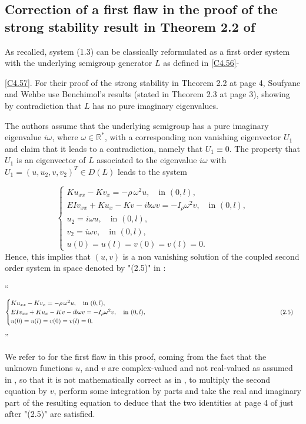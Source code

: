 \documentclass[10pt, english]{article}
\begin{document}
\subsection{Correction of a first flaw in the proof of the strong stability result in Theorem 2.2  of \cite{SW2003}}
As recalled, system (1.3) can be classically reformulated as a first order system with the underlying semigroup generator $L$ as defined in \eqref{C4.56}-{\eqref{C4.57}. For their proof of the strong stability in Theorem 2.2 at page 4, Soufyane and Wehbe \cite{SW2003} use Benchimol's results (stated in Theorem 2.3 at page 3), showing by contradiction that $L$ has no pure imaginary eigenvalues.

The authors assume that the underlying semigroup has a pure imaginary eigenvalue $i\omega$, where $\omega \in \mathbb{R}^{\ast}$, with a corresponding non vanishing eigenvector $U_1$ and claim that it leads to a contradiction, namely that $U_1 \equiv 0$. The property that $U_1$ is an eigenvector of $L$ associated to the eigenvalue $i\omega$ with $U_1=(u, u_2,v,v_2)^T \in D(L)$ leads to the system

\begin{equation}\label{R16}%
\begin{cases}
Ku_{xx} -Kv_x=-\rho\, \omega^2 u, \quad \mbox{in } (0,l),\\
EIv_{xx} +Ku_x -Kv-ib\omega v=-I_{\rho} \omega^2 v, \quad \mbox{in } (0,l),\\
u_2=i\omega u, \quad \mbox{in } (0,l),\\
v_2=i \omega v , \quad \mbox{in } (0,l),\\
u(0)=u(l)=v(0)=v(l)=0.
\end{cases}
\end{equation}
Hence, this implies that $(u,v)$ is a non vanishing solution of the coupled second order system in space denoted by "(2.5)" in \cite{SW2003}:

\enquote{
\begin{equation*}\label{R16b}%
\begin{cases}
Ku_{xx} -Kv_x=-\rho\, \omega^2 u, \quad \mbox{in } (0,l),\\
EIv_{xx} +Ku_x -Kv-ib\omega v=-I_{\rho} \omega^2 v, \quad \mbox{in } (0,l), \hspace{7.5cm}   (2.5)\\
u(0)=u(l)=v(0)=v(l)=0.
\end{cases}
\end{equation*}
}

We refer to \cite{AB2023I} for the first flaw in this proof, coming from the fact that the unknown functions $u$, and $v$ are complex-valued and not real-valued as assumed in \cite{SW2003}, so that it is not mathematically correct as in \cite{SW2003}, to multiply the second equation by $v$, perform some integration by parts and take the real and imaginary part of the resulting equation to deduce that the two identities at page 4 of \cite{SW2003} just after "(2.5)" are satisfied.

}
\end{document}
